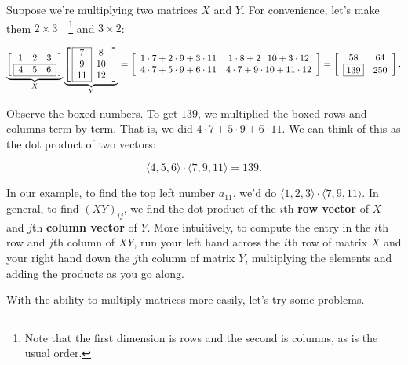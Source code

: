 \documentclass[../textbook.tex]{subfiles}
\begin{document}
Suppose we're multiplying two matrices $X$ and $Y$. For convenience, let's make them $2\times 3\quad$\footnote{Note that the first dimension is rows and the second is columns, as is the usual order.} and $3\times 2$:

\begin{center}
$$\underbrace{\left[\,\begin{array}{ccc}
1                      & 2 & 3                      \\ \hline
\multicolumn{1}{|l}{4} & 5 & \multicolumn{1}{l|}{6} \\ \hline
\end{array}\,\right]}_{X}\underbrace{\left[\,\begin{array}{|c|c}
\cline{1-1}
7  & 8  \\
9  & 10 \\
11 & 12 \\ \cline{1-1}
\end{array}\,\right]}_{Y}=\left[\begin{array}{cc}
1\cdot 7 + 2\cdot 9 + 3\cdot 11 & 1\cdot 8 + 2\cdot 10 + 3\cdot 12 \\
4\cdot 7 + 5\cdot 9 + 6\cdot 11 & 4\cdot 7 + 9\cdot 10 + 11\cdot 12 \\
\end{array}
\right]=\left[\begin{array}{cc}
58 & 64 \\
\boxed{139} & 250 \\
\end{array}\right].$$
\end{center}

\noindent Observe the boxed numbers. To get $139$, we multiplied the boxed rows and columns term by term. That is, we did $4\cdot 7 + 5\cdot 9 + 6\cdot 11$. We can think of this as the dot product of two vectors:

$$\langle 4, 5, 6\rangle \cdot \langle 7, 9, 11\rangle = 139.$$

\noindent In our example, to find the top left number $a_{11}$, we'd do $\langle 1,2,3\rangle \cdot \langle 7,9,11\rangle$. In general, to find $(XY)_{ij}$, we find the dot product of the $i$th \textbf{row vector} of $X$ and $j$th \textbf{column vector} of $Y$. More intuitively, to compute the entry in the $i$th row and $j$th column of $XY$, run your left hand across the $i$th row of matrix $X$ and your right hand down the $j$th column of matrix $Y$, multiplying the elements and adding the products as you go along.

With the ability to multiply matrices more easily, let's try some problems.
\end{document}
